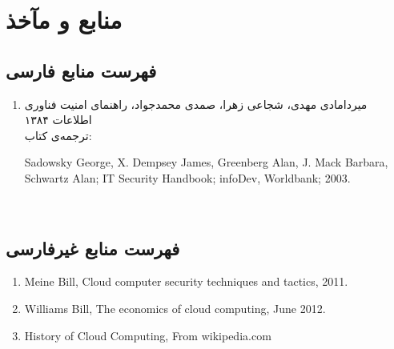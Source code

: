 \part*{منابع و مآخذ}
\chapter*{فهرست منابع فارسی}
\begin{enumerate}
\item میردامادی مهدی،‫ شجاعی زهرا، صمدی محمدجواد، راهنمای امنیت فناوری اطلاعات ۱۳۸۴
\\
ترجمه‌ی کتاب:
\begin{latin}
Sadowsky George, X. Dempsey James, Greenberg Alan, J. Mack Barbara, Schwartz Alan; IT Security Handbook; infoDev, Worldbank; 2003.
\end{latin}‬‬
\end{enumerate}
\chapter*{فهرست منابع غیرفارسی}
\begin{latin}
\begin{enumerate}
\item‫‪{Meine Bill, Cloud computer security techniques and tactics, 2011.}
\item  Williams Bill, The economics of cloud computing, June 2012.
\item History of Cloud Computing, From wikipedia.com
\end{enumerate}
\end{latin}
